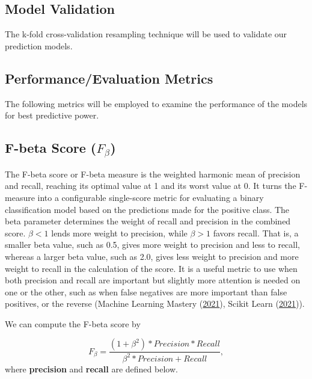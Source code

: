 \documentclass[
  10pt,
]{article}
\begin{document}
\hypertarget{model-validation}{%
\subsection{Model Validation}\label{model-validation}}

The k-fold cross-validation resampling technique will be used to validate our prediction models.

\hypertarget{performanceevaluation-metrics}{%
\subsection{Performance/Evaluation Metrics}\label{performanceevaluation-metrics}}

The following metrics will be employed to examine the performance of the models for best predictive power.

\hypertarget{f-beta-score-f_beta}{%
\subsection{\texorpdfstring{F-beta Score (\(F_\beta\))}{F-beta Score (F\_\textbackslash beta)}}\label{f-beta-score-f_beta}}

The F-beta score or F-beta measure is the weighted harmonic mean of precision and recall, reaching its optimal value at 1 and its worst value at 0. It turns the F-measure into a configurable single-score metric for evaluating a binary classification model based on the predictions made for the positive class. The beta parameter determines the weight of recall and precision in the combined score. \(\beta < 1\) lends more weight to precision, while \(\beta > 1\) favors recall. That is, a smaller beta value, such as 0.5, gives more weight to precision and less to recall, whereas a larger beta value, such as 2.0, gives less weight to precision and more weight to recall in the calculation of the score. It is a useful metric to use when both precision and recall are important but slightly more attention is needed on one or the other, such as when false negatives are more important than false positives, or the reverse (Machine Learning Mastery (\protect\hyperlink{ref-MLM}{2021}), Scikit Learn (\protect\hyperlink{ref-scikit_learn}{2021})).

We can compute the F-beta score by

\[
  F_\beta = \frac{(1 + \beta^2) * Precision * Recall}{\beta^2 * Precision + Recall},
\]
where \textbf{precision} and \textbf{recall} are defined below.
\end{document}
